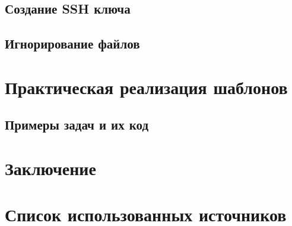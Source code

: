 \documentclass[oneside,final,14pt]{extarticle} %
\begin{document}
\subsection{Создание SSH ключа}

\newpage

\subsection{Игнорирование файлов}

\newpage

\section{Практическая реализация шаблонов}
\subsection{Примеры задач и их код}

\newpage


\section*{Заключение}

\newpage

\section*{Список использованных источников}
\setlength{\parindent}{0cm}

\newpage

\appendix
\end{document}
